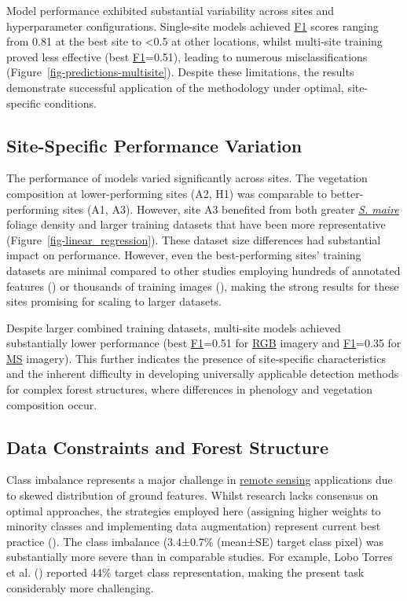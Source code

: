\documentclass[
]{scrreprt}
\begin{document}
Model performance exhibited substantial variability across sites and
hyperparameter configurations. Single-site models achieved
\hyperref[acronyms_F1]{F1} scores ranging from 0.81 at the best site to
\textless0.5 at other locations, whilst multi-site training proved less
effective (best \hyperref[acronyms_F1]{F1}=0.51), leading to numerous
misclassifications (Figure~\ref{fig-predictions-multisite}). Despite
these limitations, the results demonstrate successful application of the
methodology under optimal, site-specific conditions.

\subsection{Site-Specific Performance
Variation}\label{site-specific-performance-variation}

The performance of models varied significantly across sites. The
vegetation composition at lower-performing sites (A2, H1) was comparable
to better-performing sites (A1, A3). However, site A3 benefited from
both greater \hyperref[acronyms_SM]{\emph{S. maire}} foliage density and
larger training datasets that have been more representative
(Figure~\ref{fig-linear_regression}). These dataset size differences had
substantial impact on performance. However, even the best-performing
sites' training datasets are minimal compared to other studies employing
hundreds of annotated features
() or
thousands of training images
(), making the
strong results for these sites promising for scaling to larger datasets.

Despite larger combined training datasets, multi-site models achieved
substantially lower performance (best \hyperref[acronyms_F1]{F1}=0.51
for \hyperref[acronyms_RGB]{RGB} imagery and
\hyperref[acronyms_F1]{F1}=0.35 for \hyperref[acronyms_MS]{MS} imagery).
This further indicates the presence of site-specific characteristics and
the inherent difficulty in developing universally applicable detection
methods for complex forest structures, where differences in phenology
and vegetation composition occur.

\subsection{Data Constraints and Forest
Structure}\label{data-constraints-and-forest-structure}

Class imbalance represents a major challenge in
\hyperref[acronyms_RS]{remote sensing} applications due to skewed
distribution of ground features. Whilst research lacks consensus on
optimal approaches, the strategies employed here (assigning higher
weights to minority classes and implementing data augmentation)
represent current best practice
(). The
class imbalance (3.4±0.7\% (mean±SE) target class pixel) was
substantially more severe than in comparable studies. For example, Lobo
Torres et al. ()
reported 44\% target class representation, making the present task
considerably more challenging.
\end{document}
